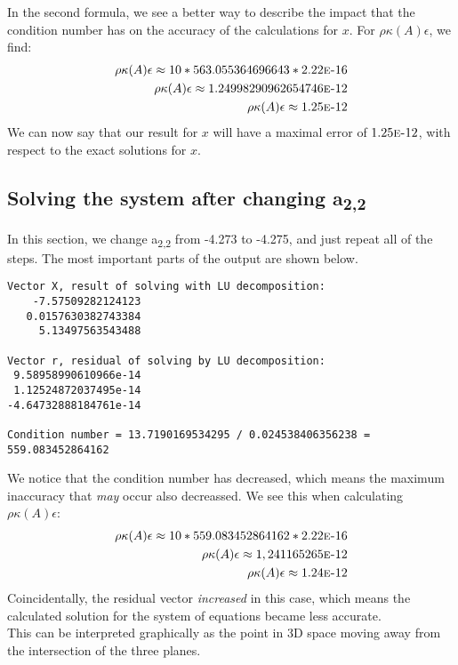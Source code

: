 \documentclass[11pt, a4paper, titlepage, openright]{article}
\begin{document}
    \newpage
    In the second formula, we see a better way to describe the impact that the condition number has on the
    accuracy of the calculations for \(x\). For \(\rho \kappa(A) \epsilon\), we find:
\begin{align*}
    \rho \kappa(A) \epsilon \approx 10 * 563.055364696643 *2.22\mbox{\sc{e}-}16\\ 
    \rho \kappa(A) \epsilon \approx 1.24998290962654746\mbox{\sc{e}-}12 \\
    \rho \kappa(A) \epsilon \approx 1.25\mbox{\sc{e}-}12
\end{align*}
     We can now say that our result for \(x\) will have a maximal error of \(1.25\mbox{\sc{e}-}12\),
     with respect to the exact solutions for \(x\).
    
    \subsection{Solving the system after changing a\textsubscript{2,2}}
    In this section, we change a\textsubscript{2,2} from -4.273 to -4.275, and just repeat all of the steps.
    The most important parts of the output are shown below.
\begin{lstlisting}
Vector X, result of solving with LU decomposition:
    -7.57509282124123 
   0.0157630382743384
     5.13497563543488

Vector r, residual of solving by LU decomposition:
 9.58958990610966e-14
 1.12524872037495e-14
-4.64732888184761e-14

Condition number = 13.7190169534295 / 0.024538406356238 = 559.083452864162
\end{lstlisting}
    We notice that the condition number has decreased, which means the maximum inaccuracy that \emph{may}
    occur also decreassed. We see this when calculating \(\rho \kappa(A) \epsilon\):
\begin{align*}
    \rho \kappa(A) \epsilon \approx 10 * 559.083452864162 *2.22\mbox{\sc{e}-}16\\ 
    \rho \kappa(A) \epsilon \approx 1,241165265\mbox{\sc{e}-}12 \\
    \rho \kappa(A) \epsilon \approx 1.24\mbox{\sc{e}-}12
\end{align*}
    Coincidentally, the residual vector \emph{increased} in this case, which means the calculated solution
    for the system of equations became less accurate. \\
    This can be interpreted graphically as the point in 3D space moving away from the intersection of
    the three planes.\\
    
\end{document}
